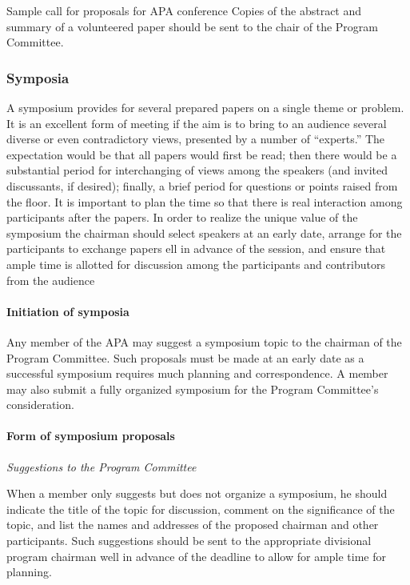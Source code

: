 \begin{refsection}
\begin{apatextbox}{Sample call for proposals for APA conference}
Copies of the abstract and summary of a volunteered paper should be sent to the chair of the Program Committee.

\subsubsection{Symposia}
\label{symposia}

A symposium provides for several prepared papers on a single theme or problem. It is an excellent form of meeting if the aim is to bring to an audience several diverse or even contradictory views, presented by a number of ``experts.'' The expectation would be that all papers would first be read; then there would be a substantial period for interchanging of views among the speakers (and invited discussants, if desired); finally, a brief period for questions or points raised from the floor. It is important to plan the time so that there is real interaction among participants after the papers. In order to realize the unique value of the symposium the chairman should select speakers at an early date, arrange for the participants to exchange papers ell in advance of the session, and ensure that ample time is allotted for discussion among the participants and contributors from the audience

\paragraph{Initiation of symposia}
\label{initiationofsymposia}

Any member of the APA may suggest a symposium topic to the chairman of the Program Committee. Such proposals must be made at an early date as a successful symposium requires much planning and correspondence. A member may also submit a fully organized symposium for the Program Committee's consideration.

\paragraph{Form of symposium proposals}
\label{formofsymposiumproposals}

\emph{Suggestions to the Program Committee}

When a member only suggests but does not organize a symposium, he should indicate the title of the topic for discussion, comment on the significance of the topic, and list the names and addresses of the proposed chairman and other participants. Such suggestions should be sent to the appropriate divisional program chairman well in advance of the deadline to allow for ample time for planning.


\end{apatextbox}
\end{refsection}
